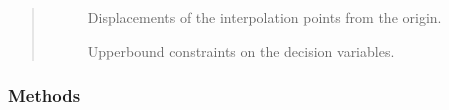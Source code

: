 \documentclass[letterpaper,10pt,english]{sphinxmanual}
\begin{document}
\begin{fulllineitems}
\begin{quote}
\begin{description}
\begin{description}
\item[{}] \leavevmode
\sphinxAtStartPar
Displacements of the interpolation points from the origin.

\item[{}] \leavevmode
\sphinxAtStartPar
Upper\sphinxhyphen{}bound constraints on the decision variables.

\end{description}

\end{description}\end{quote}
\subsubsection*{Methods}


\begin{savenotes}\sphinxatlongtablestart\begin{longtable}[c]{}
\hline

\endfirsthead

%
{}\\
\hline

\endhead

\hline
{}\\
\endfoot

\endlastfoot


\end{longtable}
\end{savenotes}
\end{fulllineitems}
\end{document}
